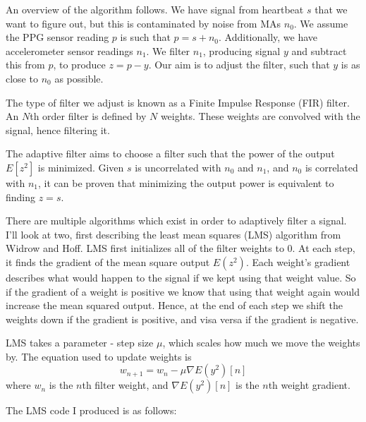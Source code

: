\documentclass[12pt,a4paper,twoside,openany]{report}
\begin{document}
An overview of the algorithm follows. We have signal from heartbeat \(s\) that
we want to figure out, but this is contaminated by noise from MAs \(n_0\).
We assume the PPG sensor reading \(p\) is such that \(p=s+n_0\). Additionally,
we have accelerometer sensor readings \(n_1\). We filter \(n_1\), producing
signal \(y\) and subtract this from \(p\), to produce \(z=p-y\). Our aim is to
adjust the filter, such that \(y\) is as close to \(n_0\) as possible. 

The type of filter we adjust is known as a Finite Impulse Response (FIR)
filter. An \(N\)th order filter is defined by \(N\) weights.
These weights are convolved with the signal, hence filtering it.

The adaptive filter aims to choose a filter such that the power of the output 
\(E[z^2]\) is minimized. Given \(s\) is uncorrelated with \(n_0\) and \(n_1\), and \(n_0\)
is correlated with \(n_1\), it can be proven that minimizing the output power
is equivalent to finding \(z=s\).

There are multiple algorithms which exist in order to adaptively filter a
signal. I'll look at two, first describing the least mean squares (LMS) algorithm from
Widrow and Hoff. LMS first initializes all of the filter weights to 0. At each
step, it finds the gradient of the mean square output \(E(z^2)\).
Each weight's gradient describes what would happen to the signal if we kept
using that weight value. So if the gradient of a weight is positive we know
that using that weight again would increase the mean squared output. Hence, at
the end of each step we shift the weights down if the gradient is positive,
and visa versa if the gradient is negative.

LMS takes a parameter - step size \(\mu\), which scales how much we move the
weights by. The equation used to update weights is \[w_{n+1}=w_n-\mu \nabla
E(y^2)[n]\]
where \(w_n\) is the \(n\)th filter weight, and \(\nabla E(y^2)[n]\) is the
\(n\)th weight gradient.

The LMS code I produced is as follows:
\end{document}
